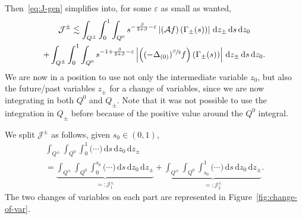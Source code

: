 \documentclass[10pt,a4paper]{amsart}
\theoremstyle{definition}
\newcommand{\cA}{{\mathcal A}}
\newcommand{\cJ}{{\mathcal J}}
\newcommand{\dd}{{\, \mathrm d}}
\let\var\varepsilon
\begin{document}
Then~\eqref{eq:J-gen} simplifies into, for
some $\var$ as small as wanted,
\begin{multline*}
{\cJ^{\pm}} \lesssim \int_{Q^\pm} \int_0^1\int_{Q^0}
s^{-\frac{\beta}{2+\beta}-\var}
\left| \left(\cA f \right) (\Gamma_\pm(s))\right| \dd z_\pm \dd s \dd z_0 \\
+ \int_{Q^\pm} \int_0^1\int_{Q^0} s^{-1 + \frac{\beta}{2+\beta}-\var} \left|\left((-\Delta_{(0)})^{\sfrac{\beta}{2}}
f\right)\left(\Gamma_\pm(s) \right) \right| \dd z_\pm \dd s \dd z_0.
\end{multline*}
We are now in a position to use not only the intermediate
variable $z_0$, but also the future/past variables $z_\pm$ for a
change of variables, since we are now integrating in both $Q^0$
and $Q_\pm$. Note that it was not possible to use the integration
in $Q_\pm$ before because of the positive value around the $Q^0$
integral.

We split {$\cJ^{\pm}$} as follows, given $s_0 \in (0,1)$,
\begin{multline*}
\int_{Q^\pm} \int_{Q^0} \int_0^1
\big(\cdots \big) \dd s \dd z_0 \dd z_\pm
\\
= \underbrace{\int_{Q^\pm} \int_{Q^0} \int_0^{s_0} \big(\cdots \big) \dd s \dd z_0 \dd
z_\pm}_{=: \cJ^\pm_1} + \underbrace{\int_{Q^\pm}
\int_{Q^0} \int_{s_0}^1 \big(\cdots \big) \dd s \dd z_0 \dd z_\pm}_{=: \cJ^\pm_2}.
\end{multline*}
The two changes of variables on each part are represented in
Figure~\ref{fig:change-of-var}.
\end{document}
